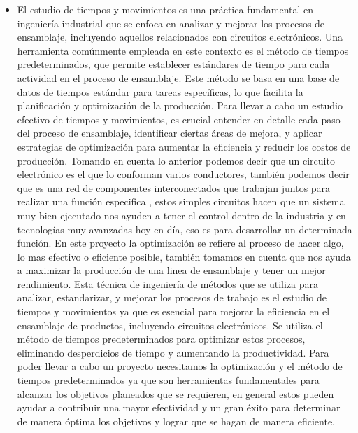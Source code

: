      \begin{itemize}
         \item 
    El estudio de tiempos y movimientos es una práctica fundamental en ingeniería industrial que se enfoca en analizar y mejorar los procesos de ensamblaje, incluyendo aquellos relacionados con circuitos electrónicos. Una herramienta comúnmente empleada en este contexto es el método de tiempos predeterminados, que permite establecer estándares de tiempo para cada actividad en el proceso de ensamblaje. Este método se basa en una base de datos de tiempos estándar para tareas específicas, lo que facilita la planificación y optimización de la producción.
    Para llevar a cabo un estudio efectivo de tiempos y movimientos, es crucial entender en detalle cada paso del proceso de ensamblaje, identificar ciertas áreas de mejora, y aplicar estrategias de optimización para aumentar la eficiencia y reducir los costos de producción.
    Tomando en cuenta lo anterior podemos decir que un circuito electrónico es el que lo conforman varios conductores, también podemos decir que es una red de componentes interconectados que trabajan juntos para realizar una función especifica , estos simples circuitos hacen que un sistema muy bien ejecutado nos ayuden a tener el control dentro de la industria y en tecnologías muy avanzadas hoy en día, eso es para desarrollar un determinada función.
    En este proyecto la optimización se refiere al proceso de hacer algo, lo mas efectivo o eficiente posible, también tomamos en cuenta que nos ayuda a maximizar la producción de una linea de ensamblaje y tener un mejor rendimiento. 
    Esta técnica de ingeniería de métodos que se utiliza para analizar, estandarizar, y mejorar los procesos de trabajo es el estudio de tiempos y movimientos ya que es esencial para mejorar la eficiencia en el ensamblaje de productos, incluyendo circuitos electrónicos. Se utiliza el método de tiempos predeterminados para optimizar estos procesos, eliminando desperdicios de tiempo y aumentando la productividad. 
    Para poder llevar a cabo un proyecto necesitamos la optimización y el método de tiempos predeterminados ya que son herramientas fundamentales para alcanzar los objetivos planeados que se requieren, en general estos pueden ayudar a contribuir una mayor efectividad y un gran éxito para determinar de manera óptima los objetivos y lograr que se hagan de manera eficiente.
     \cite{Niebel}
        
    \end{itemize} 
     
